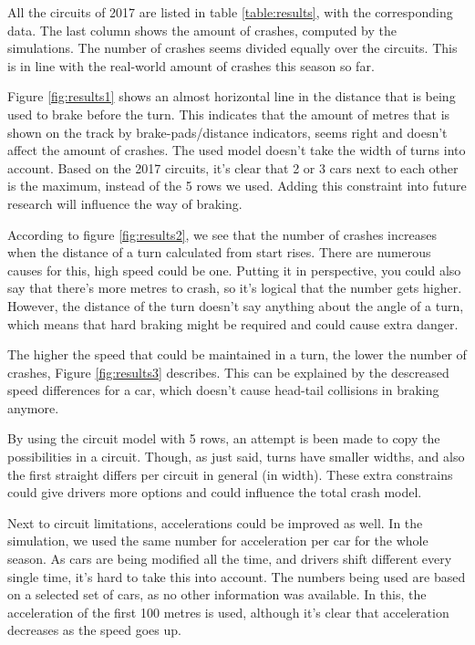 All the circuits of 2017 are listed in table \ref{table:results}, with the corresponding data. The last column shows the amount of crashes, computed by the simulations. The number of crashes seems divided equally over the circuits. This is in line with the real-world amount of crashes this season so far.

Figure \ref{fig:results1} shows an almost horizontal line in the distance that is being used to brake before the turn. This indicates that the amount of metres that is shown on the track by brake-pads/distance indicators, seems right and doesn't affect the amount of crashes. The used model doesn't take the width of turns into account. Based on the 2017 circuits, it's clear that 2 or 3 cars next to each other is the maximum, instead of the 5 rows we used. Adding this constraint into future research will influence the way of braking.

According to figure \ref{fig:results2}, we see that the number of crashes increases when the distance of a turn calculated from start rises. There are numerous causes for this, high speed could be one. Putting it in perspective, you could also say that there's more metres to crash, so it's logical that the number gets higher. However, the distance of the turn doesn't say anything about the angle of a turn, which means that hard braking might be required and could cause extra danger.

The higher the speed that could be maintained in a turn, the lower the number of crashes, Figure \ref{fig:results3} describes. This can be explained by the descreased speed differences for a car, which doesn't cause head-tail collisions in braking anymore.

By using the circuit model with 5 rows, an attempt is been made to copy the possibilities in a circuit. Though, as just said, turns have smaller widths, and also the first straight differs per circuit in general (in width). These extra constrains could give drivers more options and could influence the total crash model.

Next to circuit limitations, accelerations could be improved as well. In the simulation, we used the same number for acceleration per car for the whole season. As cars are being modified all the time, and drivers shift different every single time, it's hard to take this into account. The numbers being used are based on a selected set of cars, as no other information was available. In this, the acceleration of the first 100 metres is used, although it's clear that acceleration decreases as the speed goes up.

